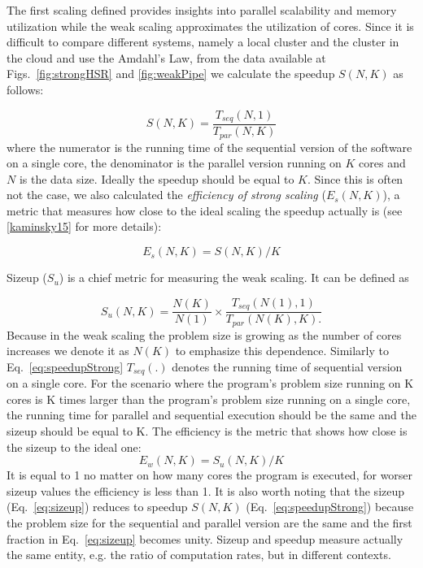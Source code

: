 \documentclass[3p,times]{elsarticle}
\begin{document}


The first scaling defined  provides insights into parallel scalability and memory utilization while the weak scaling approximates the utilization of cores. Since it is difficult to compare different systems, namely a local cluster and the cluster in the cloud and use the Amdahl's Law, from the data available at Figs.~\ref{fig:strongHSR} and \ref{fig:weakPipe} we calculate the speedup $S(N,K)$ as follows: 

\begin{equation}
\label{eq:speedupStrong}
S(N,K) = \frac{T_{seq}(N,1)}{T_{par}(N,K)}
\end{equation}
where the numerator is the running time of the sequential version of the software on a single core, the denominator is the parallel version running on $K$ cores and $N$ is the data size. Ideally the speedup should be equal to $K$. Since this is often not the case, we also calculated the \textit{efficiency of strong scaling} ($E_s(N,K)$), a metric that measures how close to the ideal scaling the speedup actually is (see \ref{kaminsky15} for more details):

$$
E_s(N,K) = S(N,K) / K
$$
 

Sizeup ($S_u$) is a chief metric for measuring the weak scaling. It can be defined as 

\begin{equation}
\label{eq:sizeup}
S_u(N,K) = \frac{N(K)}{N(1)} \times \frac{T_{seq}(N(1),1)}{T_{par}(N(K),K).}
\end{equation}
Because in the weak scaling the problem size is growing as the number of cores increases we denote it as $N(K)$ to emphasize this dependence. Similarly to Eq.~\ref{eq:speedupStrong} $T_{seq}(.)$ denotes the running time of sequential version on a single core. For the scenario where the program's problem size running on K cores is K times larger than the program's problem size running on a single core, the running time for parallel and sequential execution should be the same and the sizeup should be equal to K. The efficiency is the metric that shows how close is the sizeup to the ideal one: 
$$
E_w(N,K) = S_u(N,K) / K
$$
It is equal to 1 no matter on how many cores the program is executed, for worser sizeup values the efficiency is less than 1. It is also worth noting that the sizeup (Eq.~\ref{eq:sizeup}) reduces to speedup $S(N,K)$ (Eq.~\ref{eq:speedupStrong}) because the problem size for the sequential and parallel version are the same and the first fraction in Eq.~\ref{eq:sizeup} becomes unity. Sizeup and speedup measure actually the same entity, e.g. the ratio of computation rates, but in different contexts.
\end{document}
